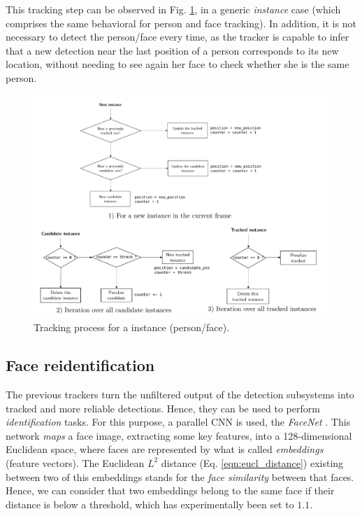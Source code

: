 This tracking step can be observed in Fig. \ref{fig:perception_tracker}, in a generic \emph{instance} case (which comprises the same behavioral for person and face tracking). In addition, it is not necessary to detect the person/face every time, as the tracker is capable to infer that a new detection near the last position of a person corresponds to its new location, without needing to see again her face to check whether she is the same person.

\begin{figure}[h]
	\includegraphics[width=16cm]{images/flowcharts}
	\caption{Tracking process for a instance (person/face).}
	\label{fig:perception_tracker}
\end{figure}


\subsection{Face reidentification}

The previous trackers turn the unfiltered output of the detection subsystems into tracked and more reliable detections. Hence, they can be used to perform \emph{identification} tasks. For this purpose, a parallel CNN is used, the \emph{FaceNet} \cite{facenet}. This network \emph{maps} a face image, extracting some key features, into a 128-dimensional Euclidean space, where faces are represented by what is called \emph{embeddings} (feature vectors). The Euclidean $L^2$ distance (Eq. \ref{eqn:eucl_distance}) existing between two of this embeddings stands for the \emph{face similarity} between that faces. Hence, we can consider that two embeddings belong to the same face if their distance is below a threshold, which has experimentally been set to $1.1$.

